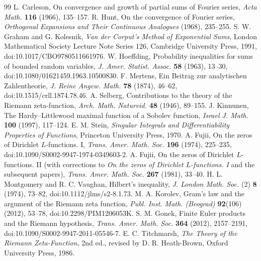 \documentclass[11pt,reqno]{amsart}
\numberwithin{equation}{section}
\begin{document}
\begin{thebibliography}{99}
 L. Carleson, On convergence and growth of partial sums of Fourier series, \emph{Acta Math.} \textbf{116} (1966), 135--157.
 R. Hunt, On the convergence of Fourier series, \emph{Orthogonal Expansions and Their Continuous Analogues} (1968), 235--255.
S. W. Graham and G. Kolesnik, \emph{Van der Corput's Method of Exponential Sums},
London Mathematical Society Lecture Note Series 126, Cambridge University Press, 1991,
doi:10.1017/CBO9780511661976.
W. Hoeffding, Probability inequalities for sums of bounded random variables,
\emph{J. Amer. Statist. Assoc.} \textbf{58} (1963), 13--30,
doi:10.1080/01621459.1963.10500830.
F. Mertens, Ein Beitrag zur analytischen Zahlentheorie,
\emph{J. Reine Angew. Math.} \textbf{78} (1874), 46--62,
doi:10.1515/crll.1874.78.46.
A. Selberg, Contributions to the theory of the Riemann zeta-function,
\emph{Arch. Math. Naturvid.} \textbf{48} (1946), 89--155.
J. Kinnunen, The Hardy--Littlewood maximal function of a Sobolev function,
\emph{Israel J. Math.} \textbf{100} (1997), 117--124.
E. M. Stein, \emph{Singular Integrals and Differentiability Properties of Functions},
Princeton University Press, 1970.
 A. Fujii, On the zeros of Dirichlet $L$-functions. I, \emph{Trans. Amer. Math. Soc.} \textbf{196} (1974), 225--235, doi:10.1090/S0002-9947-1974-0349603-2.
 A. Fujii, On the zeros of Dirichlet $L$-functions. II (with corrections to \emph{On the zeros of Dirichlet $L$-functions. I} and the subsequent papers), \emph{Trans. Amer. Math. Soc.} \textbf{267} (1981), 33--40.
 H. L. Montgomery and R. C. Vaughan, Hilbert's inequality, \emph{J. London Math. Soc.} (2) \textbf{8} (1974), 73--82, doi:10.1112/jlms/s2-8.1.73.
 M. A. Korolev, Gram's law and the argument of the Riemann zeta function, \emph{Publ. Inst. Math. (Beograd)} \textbf{92}(106) (2012), 53--78, doi:10.2298/PIM1206053K.
 S. M. Gonek, Finite Euler products and the Riemann hypothesis, \emph{Trans. Amer. Math. Soc.} \textbf{364} (2012), 2157--2191, doi:10.1090/S0002-9947-2011-05546-7.
 E. C. Titchmarsh, \emph{The Theory of the Riemann Zeta-Function}, 2nd ed., revised by D. R. Heath-Brown, Oxford University Press, 1986.
\end{thebibliography}
\end{document}

